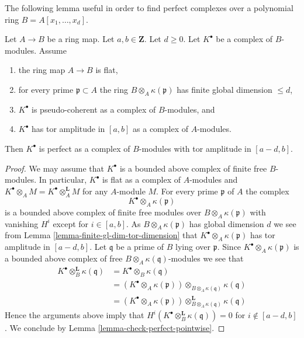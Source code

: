 \noindent
The following lemma useful in order to find perfect complexes
over a polynomial ring $B = A[x_1, \ldots, x_d]$.

\begin{lemma}
\label{lemma-perfect-over-polynomial-ring}
Let $A \to B$ be a ring map. Let $a, b \in \mathbf{Z}$. Let $d \geq 0$.
Let $K^\bullet$ be a complex of $B$-modules. Assume
\begin{enumerate}
\item the ring map $A \to B$ is flat,
\item for every prime $\mathfrak p \subset A$ the ring
$B \otimes_A \kappa(\mathfrak p)$ has finite global dimension $\leq d$,
\item $K^\bullet$ is pseudo-coherent as a complex of $B$-modules, and
\item $K^\bullet$ has tor amplitude in $[a, b]$ as a complex
of $A$-modules.
\end{enumerate}
Then $K^\bullet$ is perfect as a complex of $B$-modules
with tor amplitude in $[a - d, b]$.
\end{lemma}

\begin{proof}
We may assume that $K^\bullet$ is a bounded above complex of
finite free $B$-modules. In particular, $K^\bullet$ is flat as a
complex of $A$-modules and
$K^\bullet \otimes_A M = K^\bullet \otimes_A^{\mathbf{L}} M$ for any
$A$-module $M$. For every prime $\mathfrak p$ of $A$ the complex
$$
K^\bullet \otimes_A \kappa(\mathfrak p)
$$
is a bounded above complex of finite free modules over
$B \otimes_A \kappa(\mathfrak p)$ with vanishing $H^i$ except
for $i \in [a, b]$. As $B \otimes_A \kappa(\mathfrak p)$
has global dimension $d$ we see from
Lemma \ref{lemma-finite-gl-dim-tor-dimension}
that $K^\bullet \otimes_A \kappa(\mathfrak p)$ has tor amplitude in
$[a - d, b]$. Let $\mathfrak q$ be a prime of $B$ lying over $\mathfrak p$.
Since $K^\bullet \otimes_A \kappa(\mathfrak p)$ is a bounded above
complex of free $B \otimes_A \kappa(\mathfrak q)$-modules we see
that
\begin{align*}
K^\bullet \otimes_B^{\mathbf{L}} \kappa(\mathfrak q)
& = K^\bullet \otimes_B \kappa(\mathfrak q) \\
& = (K^\bullet \otimes_A \kappa(\mathfrak p))
\otimes_{B \otimes_A \kappa(\mathfrak q)} \kappa(\mathfrak q) \\
& = (K^\bullet \otimes_A \kappa(\mathfrak p))
\otimes^{\mathbf{L}}_{B \otimes_A \kappa(\mathfrak q)} \kappa(\mathfrak q)
\end{align*}
Hence the arguments above imply that
$H^i(K^\bullet \otimes_B^{\mathbf{L}} \kappa(\mathfrak q)) = 0$
for $i \not \in [a - d, b]$. We conclude by
Lemma \ref{lemma-check-perfect-pointwise}.
\end{proof}

